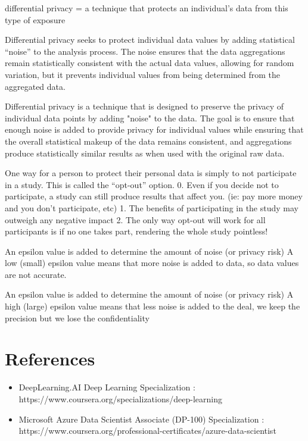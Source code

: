\documentclass[11pt, onecolumn]{article}
\begin{document}
differential privacy = a technique that protects an individual's data from this type of exposure

Differential privacy seeks to protect individual data values ​​by adding statistical “noise” to the analysis process. The noise ensures that the data aggregations remain statistically consistent with the actual data values, allowing for random variation, but it prevents individual values ​​from being determined from the aggregated data.

Differential privacy is a technique that is designed to preserve the privacy of individual data points by adding "noise" to the data. The goal is to ensure that enough noise is added to provide privacy for individual values while ensuring that the overall statistical makeup of the data remains consistent, and aggregations produce statistically similar results as when used with the original raw data.

One way for a person to protect their personal data is simply to not participate in a study. This is called the “opt-out” option.
0. Even if you decide not to participate, a study can still produce results that affect you. (ie: pay more money and you don't participate, etc)
1. The benefits of participating in the study may outweigh any negative impact
2. The only way opt-out will work for all participants is if no one takes part, rendering the whole study pointless!

An epsilon value is added to determine the amount of noise (or privacy risk)
A low (small) epsilon value means that more noise is added to data, so data values ​​are not accurate.

An epsilon value is added to determine the amount of noise (or privacy risk)
A high (large) epsilon value means that less noise is added to the deal, we keep the precision but we lose the confidentiality


\section{References}

\begin{itemize}
\item DeepLearning.AI Deep Learning Specialization : https://www.coursera.org/specializations/deep-learning
\item Microsoft Azure Data Scientist Associate (DP-100) Specialization : https://www.coursera.org/professional-certificates/azure-data-scientist
\end{itemize}
\end{document}
